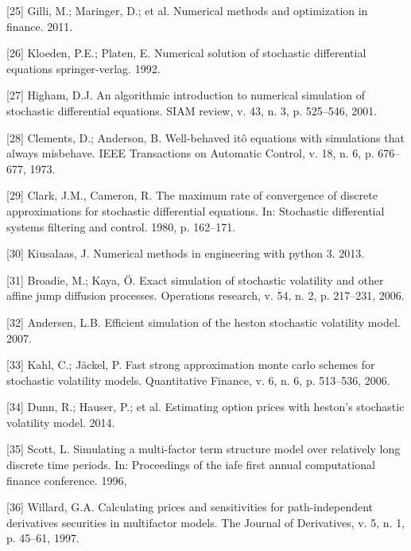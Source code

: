 \documentclass[12pt,twoside]{reedthesis}
\theoremstyle{definition}
\theoremstyle{definition}
\theoremstyle{remark}
\begin{document}
  \hypertarget{ref-gilli_numerical_2011}{}
  {[}25{]} Gilli, M.; Maringer, D.; et al. Numerical methods and
  optimization in finance. 2011.
  
  \hypertarget{ref-kloeden1992}{}
  {[}26{]} Kloeden, P.E.; Platen, E. Numerical solution of stochastic
  differential equations springer-verlag. 1992.
  
  \hypertarget{ref-higham2001}{}
  {[}27{]} Higham, D.J. An algorithmic introduction to numerical
  simulation of stochastic differential equations. SIAM review, v. 43, n.
  3, p. 525--546, 2001.
  
  \hypertarget{ref-clements1973well}{}
  {[}28{]} Clements, D.; Anderson, B. Well-behaved itô equations with
  simulations that always misbehave. IEEE Transactions on Automatic
  Control, v. 18, n. 6, p. 676--677, 1973.
  
  \hypertarget{ref-clark1980maximum}{}
  {[}29{]} Clark, J.M., Cameron, R. The maximum rate of convergence of
  discrete approximations for stochastic differential equations. In:
  Stochastic differential systems filtering and control. 1980, p.
  162--171.
  
  \hypertarget{ref-kiusalaas2013numerical}{}
  {[}30{]} Kiusalaas, J. Numerical methods in engineering with python 3.
  2013.
  
  \hypertarget{ref-broadie2006exact}{}
  {[}31{]} Broadie, M.; Kaya, Ö. Exact simulation of stochastic volatility
  and other affine jump diffusion processes. Operations research, v. 54,
  n. 2, p. 217--231, 2006.
  
  \hypertarget{ref-andersen}{}
  {[}32{]} Andersen, L.B. Efficient simulation of the heston stochastic
  volatility model. 2007.
  
  \hypertarget{ref-kahl2006fast}{}
  {[}33{]} Kahl, C.; Jäckel, P. Fast strong approximation monte carlo
  schemes for stochastic volatility models. Quantitative Finance, v. 6, n.
  6, p. 513--536, 2006.
  
  \hypertarget{ref-dunn2014estimating}{}
  {[}34{]} Dunn, R.; Hauser, P.; et al. Estimating option prices with
  heston's stochastic volatility model. 2014.
  
  \hypertarget{ref-scott1996}{}
  {[}35{]} Scott, L. Simulating a multi-factor term structure model over
  relatively long discrete time periods. In: Proceedings of the iafe first
  annual computational finance conference. 1996,
  
  \hypertarget{ref-willard1997}{}
  {[}36{]} Willard, G.A. Calculating prices and sensitivities for
  path-independent derivatives securities in multifactor models. The
  Journal of Derivatives, v. 5, n. 1, p. 45--61, 1997.
  
\end{document}
